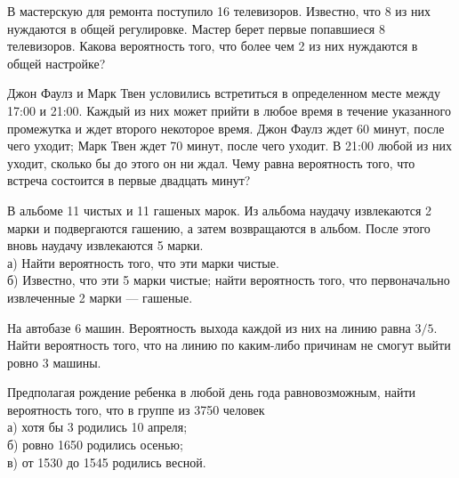 \newpage\setcounter{zad}{0}



\begin{zkrW}{20}\noindent 
	В мастерскую для ремонта поступило 16 телевизоров. Известно, что 8 из них нуждаются в общей регулировке. Мастер берет первые попавшиеся 8 телевизоров. Какова вероятность того, что более чем 2 из них нуждаются в общей настройке?
 
\end{zkrW}

\begin{zkrW}{20}\noindent 
	Джон Фаулз и Марк Твен условились встретиться в определенном месте между 17:00 и 21:00. Каждый из них может прийти в любое время в течение указанного промежутка и ждет второго некоторое время. Джон Фаулз ждет 60 минут, после чего уходит; Марк Твен ждет 70 минут, после чего уходит. В 21:00 любой из них уходит, сколько бы до этого он ни ждал. Чему равна вероятность того, что встреча состоится в первые двадцать минут?
 
\end{zkrW}

\begin{zkrW}{20}\noindent 
	В альбоме 11 чистых и 11 гашеных марок. Из альбома наудачу извлекаются 2 марки и подвергаются гашению, а затем возвращаются в альбом. После этого вновь наудачу извлекаются 5 марки. \\ \indent а) Найти вероятность того, что эти марки чистые. \\ \indent б) Известно, что эти 5 марки чистые; найти вероятность того, что первоначально извлеченные 2 марки --- гашеные.
 
\end{zkrW}

\begin{zkrW}{20}\noindent 
	На автобазе 6 машин. Вероятность выхода каждой из них на линию равна $3/5$. Найти вероятность того, что на линию по каким-либо причинам не смогут выйти ровно 3 машины.
 
\end{zkrW}

\begin{zkrW}{20}\noindent 
	Предполагая рождение ребенка в любой день года равновозможным, найти вероятность того, что в группе из 3750 человек \\ \indent а) хотя бы 3 родились 10 апреля; \\ \indent б) ровно 1650 родились осенью; \\ \indent в) от 1530 до 1545 родились весной.
 
\end{zkrW}

